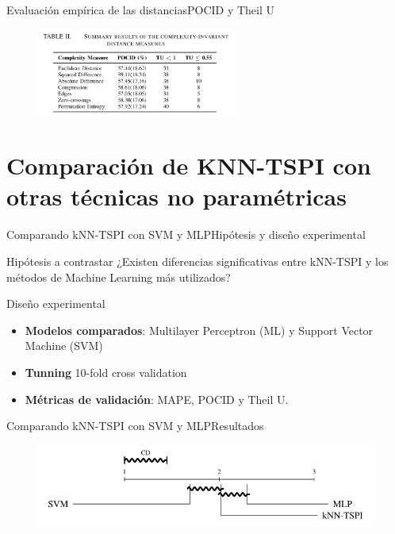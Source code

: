 \documentclass[12pt, aspectratio=169]{beamer} %
\begin{document}
\begin{frame}{Evaluación empírica de las distancias}{POCID y Theil U}
  \begin{figure}
    \includegraphics[width=0.6\textwidth]{20210313_5_tabla_cid.png}
  \end{figure}
\end{frame}


\section{Comparación de KNN-TSPI con otras técnicas no paramétricas}

\begin{frame}{Comparando kNN-TSPI con SVM y MLP}{Hipótesis y diseño experimental}

  \begin{block}{Hipótesis a contrastar}
    ¿Existen diferencias significativas entre kNN-TSPI y los métodos de Machine Learning más utilizados?
  \end{block}

  \begin{block}{Diseño experimental}
    \begin{itemize}
    \item \textbf{Modelos comparados}: Multilayer Perceptron (ML) y Support Vector Machine (SVM)
    \item \textbf{Tunning} 10-fold cross validation
    \item \textbf{Métricas de validación}: MAPE, POCID y Theil U.
    \end{itemize}
  \end{block}
  
\end{frame}

\begin{frame}{Comparando kNN-TSPI con SVM y MLP}{Resultados}
  \begin{figure}
    \includegraphics[width=\textwidth]{20210314_1_nemnyi_distancias_tecnicas_cd.png}
  \end{figure}
\end{frame}
\end{document}
